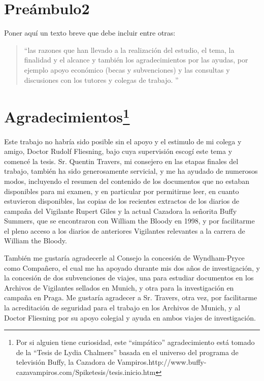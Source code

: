 \chapter*{Preámbulo2}
\thispagestyle{empty}
Poner aquí un texto breve que debe incluir entre otras:
\begin{quote}
``las razones que han llevado a la realización del estudio, el tema, la finalidad y el alcance y también los agradecimientos por las ayudas, por ejemplo apoyo económico (becas y subvenciones) y las consultas y discusiones con los tutores y colegas de trabajo. \cite{UNE50136:97}''
\end{quote}

\chapter*{Agradecimientos\footnote{Por si alguien tiene curiosidad, este ``simpático'' agradecimiento está tomado de la ``Tesis de Lydia Chalmers'' basada en el universo del programa de televisión Buffy, la Cazadora de Vampiros.http://www.buffy-cazavampiros.com/Spiketesis/tesis.inicio.htm}
}

\thispagestyle{empty}
\vspace{1cm}

Este trabajo no habría sido posible sin el apoyo y el estimulo de mi colega y amigo, Doctor Rudolf Fliesning,  bajo cuya supervisión escogí este tema y comencé la tesis. Sr. Quentin Travers, mi consejero en las etapas finales del trabajo, también ha sido generosamente servicial, y me ha ayudado de numerosos modos, incluyendo el resumen del contenido de los documentos que no estaban disponibles para mi examen, y en particular por permitirme leer, en cuanto estuvieron  disponibles, las copias de los  recientes extractos de los diarios de campaña del Vigilante Rupert Giles y la actual Cazadora la señorita Buffy Summers, que se encontraron con William the Bloody en 1998, y por facilitarme el pleno acceso  a los diarios de anteriores Vigilantes relevantes a la carrera de William the Bloody.

También me gustaría agradecerle al Consejo la concesión de Wyndham-Pryce como Compañero, el cual me ha apoyado durante mis dos años de investigación, y la concesión de dos subvenciones de viajes, una para estudiar documentos en los Archivos de Vigilantes sellados en Munich, y otra para la investigación en campaña en Praga. Me gustaría agradecer a Sr. Travers, otra vez, por facilitarme  la acreditación  de seguridad para el trabajo en los Archivos de Munich, y al Doctor Fliesning por su apoyo colegial y ayuda en ambos viajes de investigación.

